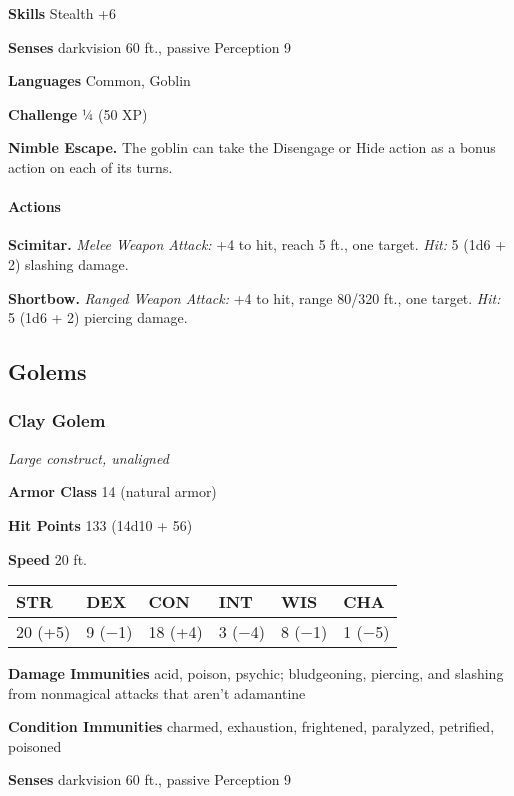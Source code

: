 \documentclass[
]{article}
\begin{document}
\textbf{Skills} Stealth +6

\textbf{Senses} darkvision 60 ft., passive Perception 9

\textbf{Languages} Common, Goblin

\textbf{Challenge} ¼ (50 XP)

\textbf{Nimble Escape.} The goblin can take the Disengage or Hide action
as a bonus action on each of its turns.

\hypertarget{actions-15}{%
\paragraph{Actions}\label{actions-15}}

\textbf{Scimitar.} \emph{Melee Weapon Attack:} +4 to hit, reach 5 ft.,
one target. \emph{Hit:} 5 (1d6 + 2) slashing damage.

\textbf{Shortbow.} \emph{Ranged Weapon Attack:} +4 to hit, range 80/320
ft., one target. \emph{Hit:} 5 (1d6 + 2) piercing damage.

\hypertarget{golems}{%
\subsection{Golems}\label{golems}}

\hypertarget{clay-golem}{%
\subsubsection{Clay Golem}\label{clay-golem}}

\emph{Large construct, unaligned}

\textbf{Armor Class} 14 (natural armor)

\textbf{Hit Points} 133 (14d10 + 56)

\textbf{Speed} 20 ft.

\begin{longtable}[]{@{}llllll@{}}
\toprule
STR & DEX & CON & INT & WIS & CHA\tabularnewline
\midrule
\endhead
20 (+5) & 9 (−1) & 18 (+4) & 3 (−4) & 8 (−1) & 1 (−5)\tabularnewline
\bottomrule
\end{longtable}

\textbf{Damage Immunities} acid, poison, psychic; bludgeoning, piercing,
and slashing from nonmagical attacks that aren't adamantine

\textbf{Condition Immunities} charmed, exhaustion, frightened,
paralyzed, petrified, poisoned

\textbf{Senses} darkvision 60 ft., passive Perception 9
\end{document}
